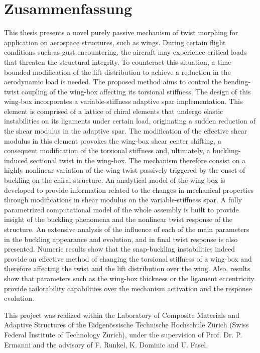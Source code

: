 \section*{Zusammenfassung}

This thesis presents a novel purely passive mechanism of twist morphing for application on aerospace structures, such as wings. During certain flight conditions such as gust encountering, the aircraft may experience critical loads that threaten the structural integrity. To counteract this situation, a time-bounded modification of the lift distribution to achieve a reduction in the aerodynamic load is needed. The proposed method aims to control the bending-twist coupling of the wing-box affecting its torsional stiffness. The design of this wing-box incorporates a variable-stiffness adaptive spar implementation. This element is comprised of a lattice of chiral elements that undergo elastic instabilities on its ligaments under certain load, originating a sudden reduction of the shear modulus in the adaptive spar. The modification of the effective shear modulus in this element provokes the wing-box shear center shifting, a consequent modification of the torsional stiffness and, ultimately, a buckling-induced sectional twist in the wing-box. The mechanism therefore consist on a highly nonlinear variation of the wing twist passively triggered by the onset of buckling on the chiral structure. An analytical model of the wing-box is developed to provide information related to the changes in mechanical properties through modifications in shear modulus on the variable-stiffness spar. A fully parametrized computational model of the whole assembly is built to provide insight of the buckling phenomena and the nonlinear twist response of the structure. An extensive analysis of the influence of each of the main parameters in the buckling appearance and evolution, and in final twist response is also presented. Numeric results show that the snap-buckling instabilities indeed provide an effective method of changing the torsional stiffness of a wing-box and therefore affecting the twist and the lift distribution over the wing. Also, results show that parameters such as the wing-box thickness or the ligament eccentricity provide tailorability capabilities over the mechanism activation and the response evolution.



\vfill
\normalsize
\noindent
This project was realized within the Laboratory of Composite Materials and Adaptive Structures of the Eidgen\"ossische Technische Hochschule Z\"urich (Swiss Federal Institute of Technology Zurich), under the supervision of Prof. Dr. P. Ermanni and the advisory of F. Runkel, K. Dominic and U. Fasel.